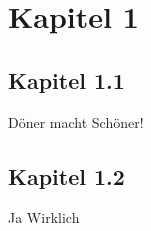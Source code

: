 
\section{Kapitel 1}

\subsection{Kapitel 1.1}

Döner macht Schöner!

\subsection{Kapitel 1.2}
Ja Wirklich